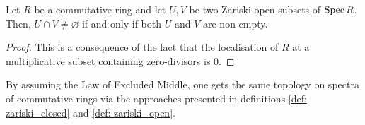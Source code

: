             \begin{proposition} \label{prop: zariski_open_subsets_are_large}
                Let $R$ be a commutative ring and let $U, V$ be two Zariski-open subsets of $\operatorname{Spec} R$. Then, $U \cap V \not = \varnothing$ if and only if both $U$ and $V$ are non-empty.
            \end{proposition}
                \begin{proof}
                    This is a consequence of the fact that the localisation of $R$ at a multiplicative subset containing zero-divisors is $0$.
                \end{proof}
            
            \begin{proposition} \label{prop: zariski_topology_equivalence}
                By assuming the Law of Excluded Middle, one gets the same topology on spectra of commutative rings via the approaches presented in definitions \ref{def: zariski_closed} and \ref{def: zariski_open}.
            \end{proposition}
